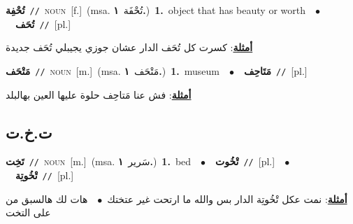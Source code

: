 \documentclass[10pt,a4paper,twoside]{article} %
\begin{document}
\begin{multicols}{2}
{{{\setlength\topsep{0pt}\textbf{\foreignlanguage{arabic}{تُحْفِة}}\ {\color{gray}\texttt{//}\color{black}}\ \textsc{noun}\ [f.]\ \color{gray}(msa. \foreignlanguage{arabic}{تُحْفَة}~\foreignlanguage{arabic}{\textbf{١.}})\color{black}\ \textbf{1.}~object that has beauty or worth\ \ $\bullet$\ \ \setlength\topsep{0pt}\textbf{\foreignlanguage{arabic}{تُحَف}}\ {\color{gray}\texttt{//}\color{black}}\ [pl.]\  \begin{flushright}\color{gray}\foreignlanguage{arabic}{\textbf{\underline{\foreignlanguage{arabic}{أمثلة}}}: كسرت كل تُحَف الدار عشان جوزي يجيبلي تُحَف جديدة}\end{flushright}\color{black}} \vspace{2mm}

{\setlength\topsep{0pt}\textbf{\foreignlanguage{arabic}{مَتْحَف}}\ {\color{gray}\texttt{//}\color{black}}\ \textsc{noun}\ [m.]\ \color{gray}(msa. \foreignlanguage{arabic}{مَتْحَف}~\foreignlanguage{arabic}{\textbf{١.}})\color{black}\ \textbf{1.}~museum\ \ $\bullet$\ \ \setlength\topsep{0pt}\textbf{\foreignlanguage{arabic}{مَتَاحِف}}\ {\color{gray}\texttt{//}\color{black}}\ [pl.]\  \begin{flushright}\color{gray}\foreignlanguage{arabic}{\textbf{\underline{\foreignlanguage{arabic}{أمثلة}}}: فش عنا مَتاحِف حلوة عليها العين بهالبلد}\end{flushright}\color{black}} \vspace{2mm}

\vspace{-3mm}
\subsection*{\color{blue}\foreignlanguage{arabic}{ت.خ.ت}\color{blue}{}} 

{\setlength\topsep{0pt}\textbf{\foreignlanguage{arabic}{تَخِت}}\ {\color{gray}\texttt{//}\color{black}}\ \textsc{noun}\ [m.]\ \color{gray}(msa. \foreignlanguage{arabic}{سَرير}~\foreignlanguage{arabic}{\textbf{١.}})\color{black}\ \textbf{1.}~bed\ \ $\bullet$\ \ \setlength\topsep{0pt}\textbf{\foreignlanguage{arabic}{تْخُوت}}\ {\color{gray}\texttt{//}\color{black}}\ [pl.]\ \ $\bullet$\ \ \setlength\topsep{0pt}\textbf{\foreignlanguage{arabic}{تْخُوتِة}}\ {\color{gray}\texttt{//}\color{black}}\ [pl.]\  \begin{flushright}\color{gray}\foreignlanguage{arabic}{\textbf{\underline{\foreignlanguage{arabic}{أمثلة}}}: نمت عكل تْخُوتِة الدار بس والله ما ارتحت غير عتختك\ $\bullet$\ \  هات لك هالسبق من على التخت}\end{flushright}\color{black}} \vspace{2mm}

}}
\end{multicols}
\end{document}
